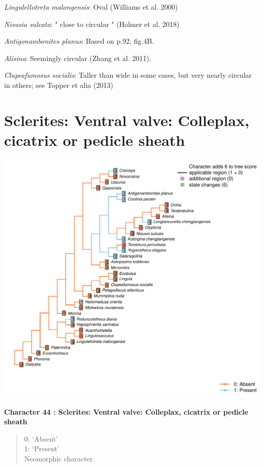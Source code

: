 \documentclass[]{book}
\theoremstyle{definition}
\theoremstyle{definition}
\theoremstyle{definition}
\theoremstyle{remark}
\begin{document}
\emph{Lingulellotreta malongensis}: Oval (Williams et al. 2000)

\emph{Nisusia sulcata}: " close to circular " (Holmer et al. 2018)

\emph{Antigonambonites planus}: Based on p.92, fig.4B.

\emph{Alisina}: Seemingly circular (Zhang et al. 2011).

\emph{Clupeafumosus socialis}: Taller than wide in some cases, but very
nearly circular in others; see Topper et alia (2013)

\hypertarget{sclerites-ventral-valve-colleplax-cicatrix-or-pedicle-sheath}{%
\section*{Sclerites: Ventral valve: Colleplax, cicatrix or pedicle
sheath}\label{sclerites-ventral-valve-colleplax-cicatrix-or-pedicle-sheath}}

\includegraphics{Brachiopod_phylogeny_files/figure-latex/unnamed-chunk-5-44.pdf}

\textbf{Character 44 : Sclerites: Ventral valve: Colleplax, cicatrix or
pedicle sheath }

\begin{quote}
0: `Absent'\\
1: `Present'\\
Neomorphic character.
\end{quote}
\end{document}
